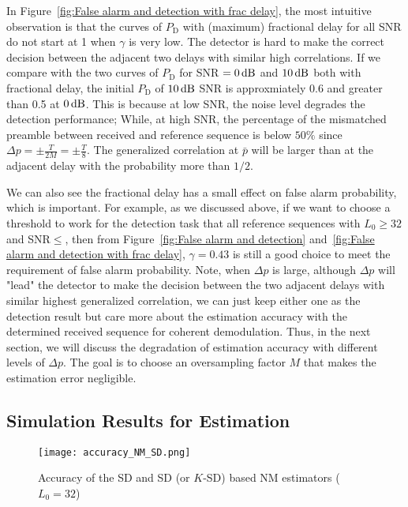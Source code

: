 In Figure~\ref{fig:False alarm and detection with frac delay}, the most intuitive observation is that the curves of $P_{\text{D}}$ with (maximum) fractional delay for all SNR
do not start at 1 when $\gamma$ is very low. The detector is hard to make the correct decision between the adjacent two delays with similar high correlations. 
If we compare with the two curves of $P_{\text{D}}$ for SNR $=\numb{0}\dB$ and $\numb{10}\dB$
both with fractional delay, the initial $P_{\text{D}}$ of $\numb{10}\dB$ SNR is approxmiately 0.6 and greater than 0.5 at $\numb{0}\dB$.
This is because at low SNR, the noise level degrades the detection performance; While, at high SNR, 
the percentage of the mismatched preamble between received and reference sequence 
is below $50\%$ since $\Delta p{=}{\pm}\frac{T}{2M}{=}{\pm}\frac{T}{8}$. The generalized correlation
at $\bar{p}$ will be larger than at the adjacent delay with the probability more than $1/2$.

We can also see the fractional delay has a small effect on false alarm probability, which is important. For example, as we discussed above,
if we want to choose a threshold to work for the detection task that all reference sequences with $L_0 {\geq} 32$
and SNR${\leq}$\dB, then from Figure~\ref{fig:False alarm and detection} and~\ref{fig:False alarm and detection with frac delay},
$\gamma=0.43$ is still a good choice to meet the requirement of false alarm probability. Note, when $\Delta p$ is large, although $\Delta p$ will "lead" the 
detector to make the decision between the two adjacent delays with similar highest generalized correlation,
we can just keep either one as the detection result but care more about the estimation accuracy with the determined received sequence
for coherent demodulation. Thus, in the next section, we will discuss the degradation of estimation accuracy with different levels of $\Delta p$.
The goal is to choose an oversampling factor $M$ that makes the estimation error negligible.


 


\subsection{Simulation Results for Estimation}

\begin{figure}[t]
    \centerline{\texttt{[image: accuracy\_NM\_SD.png]}}
    \caption{Accuracy of the SD and SD (or $K$-SD) based NM estimators ($L_0=32$)}
    \label{fig:accuracy_NM_SD}
    \end{figure}

